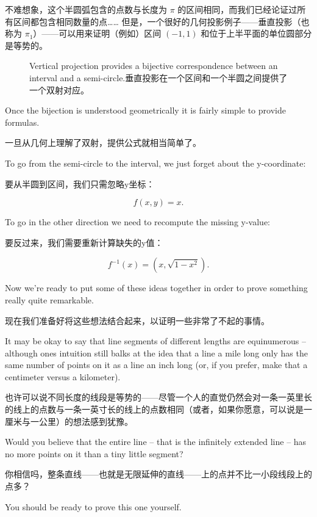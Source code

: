 不难想象，这个半圆弧包含的点数与长度为 $\pi$ 的区间相同，而我们已经论证过所有区间都包含相同数量的点…… 但是，一个很好的几何投影例子——垂直投影（也称为 $\pi_1$）——可以用来证明（例如）区间 $(-1, 1)$ 和位于上半平面的单位圆部分是等势的。

\begin{figure}[!hbtp]
    
    \caption[An interval is equivalent to a semi-circle.一个区间等价于一个半圆。]{Vertical projection %
        provides a bijective correspondence between an interval and a semi-circle.垂直投影在一个区间和一个半圆之间提供了一个双射对应。
    }
    \label{fig:interval_n_semicircle}
\end{figure}

Once the bijection is understood geometrically it is fairly simple to provide
formulas.

一旦从几何上理解了双射，提供公式就相当简单了。

To go from the semi-circle to the interval, we just forget
about the y-coordinate:

要从半圆到区间，我们只需忽略y坐标：

\[ f(x, y) = x.
\]

To go in the other direction we need to recompute the missing y-value:

要反过来，我们需要重新计算缺失的y值：

\[ f^{-1}(x) = (x, \sqrt{1 - x^2}).\]

Now we're ready to put some of these ideas together in order to prove
something really quite remarkable.

现在我们准备好将这些想法结合起来，以证明一些非常了不起的事情。

It may be okay to say that line segments
of different lengths are equinumerous -- although ones intuition still balks
at the idea that a line a mile long only has the same number of points on
it as a line an inch long (or, if you prefer, make that a centimeter versus
a kilometer).

也许可以说不同长度的线段是等势的——尽管一个人的直觉仍然会对一条一英里长的线上的点数与一条一英寸长的线上的点数相同（或者，如果你愿意，可以说是一厘米与一公里）的想法感到犹豫。

Would you believe that the entire line -- that is the infinitely
extended line -- has no more points on it than a tiny little segment?

你相信吗，整条直线——也就是无限延伸的直线——上的点并不比一小段线段上的点多？

You
should be ready to prove this one yourself.

